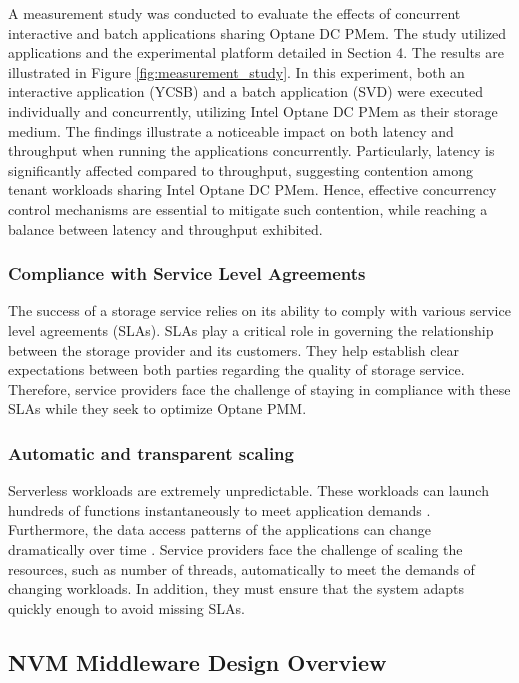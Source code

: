 A measurement study was conducted to evaluate the effects of concurrent interactive and batch applications sharing Optane DC PMem. The study utilized applications and the experimental platform detailed in Section 4. The results are illustrated in Figure \ref{fig:measurement_study}. In this experiment, both an interactive application (YCSB) and a batch application (SVD) were executed individually and concurrently, utilizing Intel Optane DC PMem as their storage medium. The findings illustrate a noticeable impact on both latency and throughput when running the applications concurrently. Particularly, latency is significantly affected compared to throughput, suggesting contention among tenant workloads sharing Intel Optane DC PMem. Hence, effective concurrency control mechanisms are essential to mitigate such contention, while reaching a balance between latency and throughput exhibited.

\subsubsection{Compliance with Service Level Agreements}
The success of a storage service relies on its ability to comply with various service level agreements (SLAs). SLAs play a critical role in governing the relationship between the storage provider and its customers. They help establish clear expectations between both parties regarding the quality of storage service. Therefore, service providers face the challenge of staying in compliance with these SLAs while they seek to optimize Optane PMM. 

\subsubsection{Automatic and transparent scaling}

Serverless workloads are extremely unpredictable. These workloads can launch hundreds of functions instantaneously to meet application demands \cite{klimovic2018understanding}. Furthermore, the data access patterns of the applications can change dramatically over time \cite{romero2021faat,wu2019autoscaling}. Service providers face the challenge of scaling the resources, such as number of threads, automatically to meet the demands of changing workloads. In addition, they must ensure that the system adapts quickly enough to avoid missing SLAs.

\subsection{NVM Middleware Design Overview}

